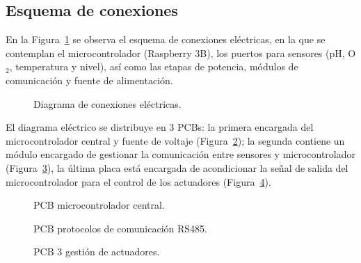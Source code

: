 \documentclass[11pt,tesis,twoside,openright,spanish]{upiiztt}
\begin{document}
\subsection{Esquema de conexiones}

En la Figura~\ref{fig:esquema_electrico} se observa el esquema de conexiones eléctricas, en la que se
contemplan el microcontrolador (Raspberry 3B), los puertos para sensores (pH,
O$_2$, temperatura y nivel), así como las etapas de potencia, módulos de
comunicación y fuente de alimentación.

\begin{figure}[H]
  \centering
  \caption{Diagrama de conexiones eléctricas.}
  \label{fig:esquema_electrico}
\end{figure}

El diagrama eléctrico se distribuye en 3 PCBs: la primera encargada del
microcontrolador central y fuente de voltaje (Figura~\ref{fig:pcb1}); la segunda contiene un
módulo encargado de gestionar la comunicación entre sensores y microcontrolador
(Figura~\ref{fig:pcb2}), la última placa está encargada de acondicionar la señal de salida del
microcontrolador para el control de los actuadores (Figura~\ref{fig:pcb3}).

\begin{figure}[H]
  \centering
  \caption{PCB microcontrolador central.}
  \label{fig:pcb1}
\end{figure}

\begin{figure}[H]
  \centering
  \caption{PCB protocolos de comunicación RS485.}
  \label{fig:pcb2}
\end{figure}

\begin{figure}[H]
  \centering
  \caption{PCB 3 gestión de actuadores.}
  \label{fig:pcb3}
\end{figure}
\end{document}
